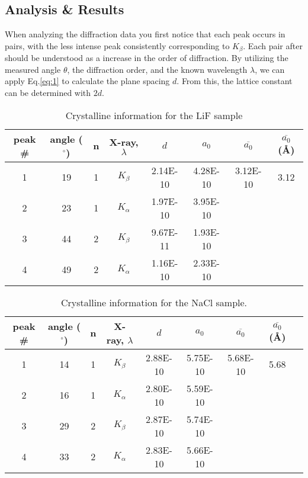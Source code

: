 \documentclass[a4paper,12pt,english]{all-in-one} %
\begin{document}
\begin{multicols}{2}
\section*{Analysis \& Results}
{
When analyzing the diffraction data you first notice that each peak occurs in pairs, with the less intense peak consistently corresponding to $K_\beta$. Each pair after should be understood as a increase in the order of diffraction. By utilizing the measured angle $\theta$, the diffraction order, and the known wavelength $\lambda$, we can apply Eq.\eqref{eq:1} to calculate the plane spacing $d$. From this, the lattice constant can be determined with $2d$.

\begin{table*}[]
\centering
\begin{tabular}{c|c|c|c|c|c|c|c}
peak \# & angle ($^\circ$) & n & X-ray, $\lambda$ & $d$ & $a_0$ & $\overline{a_0}$ & $\overline{a_0}$ (\AA) \\ \hline
1 & 19 & 1 & $K_\beta$ & 2.14E-10 & 4.28E-10  & 3.12E-10 & 3.12\\
2 & 23 & 1 & $K_\alpha$ & 1.97E-10 & 3.95E-10 \\
3 & 44 & 2 & $K_\beta$ & 9.67E-11	& 1.93E-10\\
4 & 49 & 2 & $K_\alpha$ & 1.16E-10 & 2.33E-10 \\   
\end{tabular}
\caption{Crystalline information for the LiF sample}
\label{tab:lif}
\end{table*}

\begin{table*}[]
\centering
\begin{tabular}{c|c|c|c|c|c|c|c|c}
peak \# & angle ($^\circ$) & n & X-ray, $\lambda$ & $d$ & $a_0$ & $\overline{a_0}$ & $\overline{a_0}$ (\AA) \\ \hline
1 & 14 & 1 & $K_\beta$ & 2.88E-10 & 5.75E-10 & 5.68E-10 & 5.68 \\
2 & 16 & 1 & $K_\alpha$ & 2.80E-10 & 5.59E-10 \\
3 & 29 & 2 & $K_\beta$ & 2.87E-10 & 5.74E-10\\
4 & 33 & 2 & $K_\alpha$ & 2.83E-10 & 5.66E-10 \\  
\end{tabular}
\caption{Crystalline information for the NaCl sample.}
\label{tab:nacl}
\end{table*}

}
\end{multicols}
\end{document}
